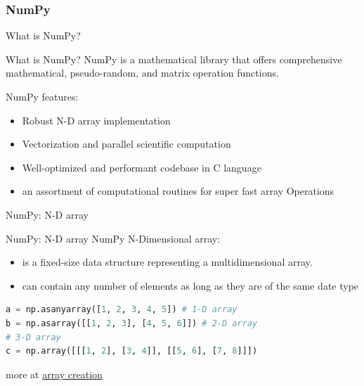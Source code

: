 \documentclass{beamer}
\begin{document}
    \subsubsection{NumPy}
    \begin{frame}[fragile]{What is NumPy?}
        \begin{block}{What is NumPy?}
            NumPy is a mathematical library that offers comprehensive mathematical, pseudo-random, and matrix operation functions.
        \end{block}
        NumPy features:
        \begin{itemize}
            \item Robust N-D array implementation
            \item Vectorization and parallel scientific computation
            \item Well-optimized and performant codebase in C language
            \item an assortment of computational routines for super fast array Operations
        \end{itemize}
    \end{frame}
    \begin{frame}[fragile]{NumPy: N-D array}
        \begin{block}{NumPy: N-D array}
            NumPy N-Dimensional array:
            \begin{itemize}
                \item is a fixed-size data structure representing a multidimensional array.
                \item can contain any number of elements as long as they are of the same date type
            \end{itemize}
        \end{block}
        \begin{example}
            \begin{lstlisting}[language=Python]
a = np.asanyarray([1, 2, 3, 4, 5]) # 1-D array
b = np.asarray([[1, 2, 3], [4, 5, 6]]) # 2-D array
# 3-D array
c = np.array([[[1, 2], [3, 4]], [[5, 6], [7, 8]]])
            \end{lstlisting}
        \end{example}
        more at \href{https://numpy.org/doc/stable/reference/routines.array-creation.html}{array creation}
    \end{frame}
\end{document}
